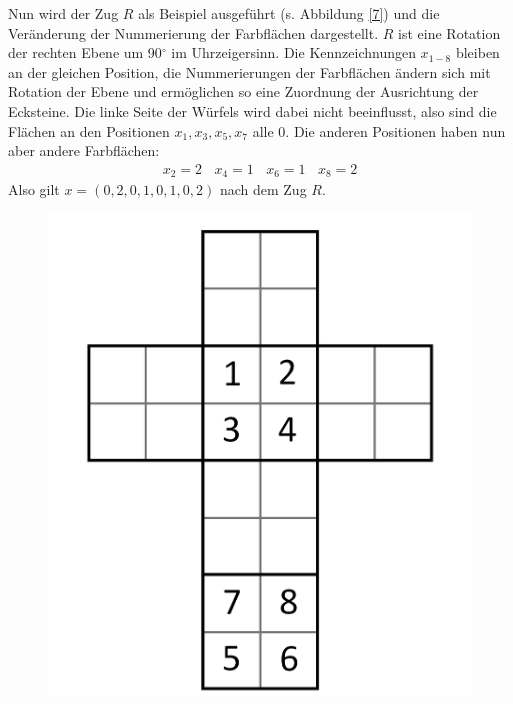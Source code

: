 \documentclass[12pt,a4paper, usenames, dvipsnames]{article}
\theoremstyle{mystyle}
\theoremstyle{definition}
\begin{document}
Nun wird der Zug $R$ als Beispiel ausgeführt (s. Abbildung \ref{7}) und die Veränderung der Nummerierung der Farbflächen dargestellt. $R$ ist eine Rotation der rechten Ebene um 90$^\circ$ im Uhrzeigersinn. 
Die Kennzeichnungen $x_{1-8}$ bleiben an der gleichen Position, die Nummerierungen  der Farbflächen ändern sich mit Rotation der Ebene und ermöglichen so eine Zuordnung der Ausrichtung der Ecksteine. 
Die linke Seite der Würfels wird dabei nicht beeinflusst, also sind die Flächen an den Positionen $x_1, x_3, x_5, x_7$ alle 0. 
Die anderen Positionen haben nun aber andere Farbflächen: 
\begin{align*}
x_2 = 2 \ \ \ \ x_4 = 1 \ \ \ \ x_6 = 1 \ \ \ \ x_8 = 2  
\end{align*}
Also gilt $x = (0, 2, 0, 1, 0, 1, 0, 2)$ nach dem Zug $R$. 
\begin{figure}[h]
\centering
\includegraphics[scale=0.1]{foldedout_012_white.png}

\end{figure}
\end{document}
